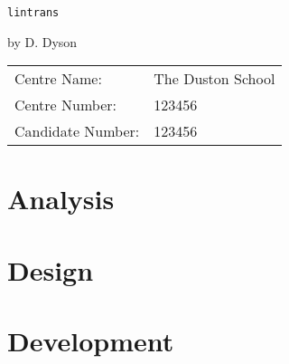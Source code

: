 \documentclass[a4paper]{article}
\newcommand{\setspacing}{\setlength{\parindent}{0em}\setlength{\parskip}{1em}}
\begin{document}

\begin{center}
	\vspace*{6.5cm}

	\Huge{\texttt{lintrans}}

	\vspace{0.8cm}

	\Large{by D. Dyson}

	\vfill
\end{center}

{\large
\begin{tabular}{ll}
Centre Name:& The Duston School\\
Centre Number:& 123456\\
Candidate Number:& 123456
\end{tabular}
}

\normalsize

\thispagestyle{empty}
\newpage



\thispagestyle{fancy}
\cfoot{\thepage}

\tableofcontents
\newpage



\setspacing



\section{Analysis\label{analysis}}


\newpage

\section{Design\label{design}}


\newpage

\section{Development\label{development}}

\end{document}
